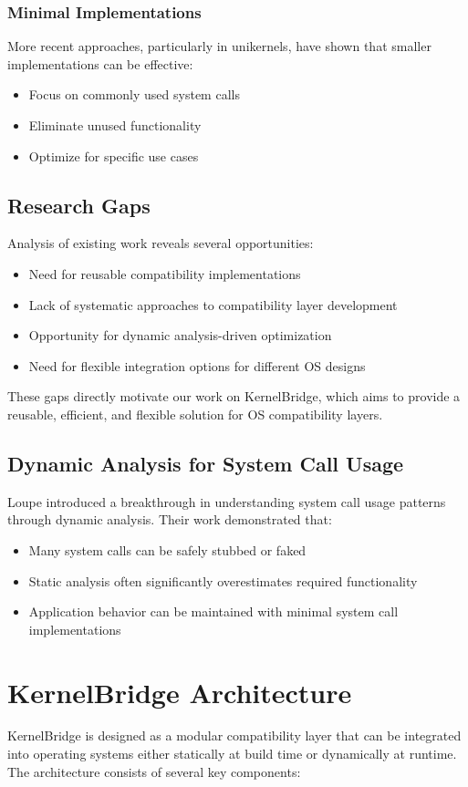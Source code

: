 \documentclass[conference]{IEEEtran}
\begin{document}
\subsubsection{Minimal Implementations}
More recent approaches, particularly in unikernels, have shown that smaller implementations can be effective:
\begin{itemize}
	\item Focus on commonly used system calls
	\item Eliminate unused functionality
	\item Optimize for specific use cases
\end{itemize}

\subsection{Research Gaps}
Analysis of existing work reveals several opportunities:
\begin{itemize}
	\item Need for reusable compatibility implementations
	\item Lack of systematic approaches to compatibility layer development
	\item Opportunity for dynamic analysis-driven optimization
	\item Need for flexible integration options for different OS designs
\end{itemize}

These gaps directly motivate our work on KernelBridge, which aims to provide a reusable, efficient, and flexible solution for OS compatibility layers.
\subsection{Dynamic Analysis for System Call Usage}
Loupe \cite{lefeuvre2024loupe} introduced a breakthrough in understanding system call usage patterns through dynamic analysis. Their work demonstrated that:
\begin{itemize}
	\item Many system calls can be safely stubbed or faked
	\item Static analysis often significantly overestimates required functionality
	\item Application behavior can be maintained with minimal system call implementations
\end{itemize}

\section{KernelBridge Architecture}
KernelBridge is designed as a modular compatibility layer that can be integrated into operating systems either statically at build time or dynamically at runtime. The architecture consists of several key components:
\end{document}
